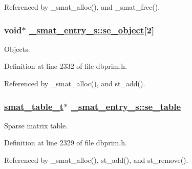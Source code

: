Referenced by \_\-smat\_\-alloc(), and \_\-smat\_\-free().\hypertarget{struct__smat__entry__s_o4}{
\subsubsection[se\_\-object]{\setlength{\rightskip}{0pt plus 5cm}void$\ast$ \hyperlink{struct__smat__entry__s_o4}{\_\-smat\_\-entry\_\-s::se\_\-object}\mbox{[}2\mbox{]}}}
\label{struct__smat__entry__s_o4}


Objects. 

Definition at line 2332 of file dbprim.h.

Referenced by \_\-smat\_\-alloc(), and st\_\-add().\hypertarget{struct__smat__entry__s_o1}{
\subsubsection[se\_\-table]{\setlength{\rightskip}{0pt plus 5cm}\hyperlink{struct__smat__table__s}{smat\_\-table\_\-t}$\ast$ \hyperlink{struct__smat__entry__s_o1}{\_\-smat\_\-entry\_\-s::se\_\-table}}}
\label{struct__smat__entry__s_o1}


Sparse matrix table. 

Definition at line 2329 of file dbprim.h.

Referenced by \_\-smat\_\-alloc(), st\_\-add(), and st\_\-remove().